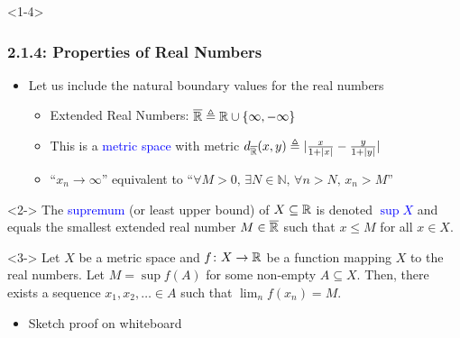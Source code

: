 \documentclass[10pt,english,aspectratio=169]{beamer}
\begin{document}
\begin{frame}<1-4>
\frametitle{2.1.4: Properties of Real Numbers}

\begin{itemize}
\setlength\itemsep{3mm}
\item<1-> Let us include the natural boundary values for the real numbers \vspace{1mm}

\begin{itemize} 
  \setlength\itemsep{1.5mm}
  \item Extended Real Numbers: $\overline{\mathbb{R}} \triangleq \mathbb{R} \cup \{ \infty,-\infty\}$
  \item This is a \textcolor{blue}{metric space} with metric $d_{\overline{\mathbb{R}}} (x,y) \triangleq |\frac{x}{1+|x|} - \frac{y}{1+|y|}|$
  \item ``$x_n \to \infty$'' equivalent to ``$\forall M>0, \, \exists N\in \mathbb{N}, \, \forall n>N, \, x_n > M$''
\end{itemize}
\end{itemize}

\begin{definition}<2->
The \textcolor{blue}{supremum} (or least upper bound) of $X\subseteq \mathbb{R}$ is denoted \textcolor{blue}{$\sup X$} and equals the smallest extended real number $M \in \overline{\mathbb{R}}$ such that $x\leq M$ for all $x\in X$.
\end{definition}

\begin{lemma}<3->
Let $X$ be a metric space and $f \colon X\rightarrow \mathbb{R}$ be a function mapping $X$ to the real numbers.
Let $M = \sup f(A)$ for some non-empty $A \subseteq X$.
Then, there exists a sequence $x_1,x_2,\ldots \in A$ such that $\lim_n f(x_n) = M$.
\end{lemma}

\begin{itemize}
\item<4-> Sketch proof on whiteboard
\end{itemize}


\end{frame}
\end{document}
